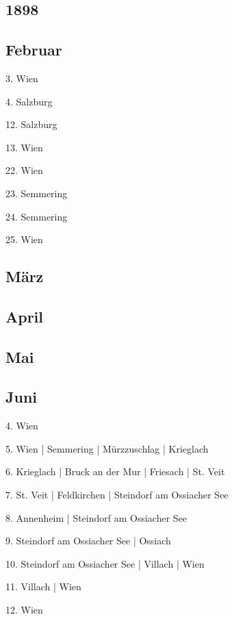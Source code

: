 \documentclass[twoside=false,titlepage=false,open=any, parskip=never, fontsize=10pt, headings=small, chapterprefix=false, appendixprefix=false, DIV=15]{scrbook}
\begin{document}
\begin{multicols}{3}
            \chapter*{1898}
            \section*{Februar}
            3. Wien\par
            4. Salzburg\par
            12. Salzburg\par
            13. Wien\par
            22. Wien\par
            23. Semmering\par
            24. Semmering\par
            25. Wien\par
            \section*{März}
            \section*{April}
            \section*{Mai}
            \section*{Juni}
            4. Wien\par
            5. Wien | Semmering | Mürzzuschlag | Krieglach\par
            6. Krieglach | Bruck an der Mur | Friesach | St. Veit\par
            7. St. Veit | Feldkirchen | Steindorf am Ossiacher See\par
            8. Annenheim | Steindorf am Ossiacher See\par
            9. Steindorf am Ossiacher See | Ossiach\par
            10. Steindorf am Ossiacher See | Villach | Wien\par
            11. Villach | Wien\par
            12. Wien\par

\end{multicols}
\end{document}
